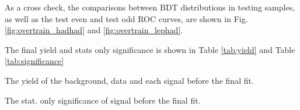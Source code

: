

As a cross check, the comparisons between BDT distributions in testing samples, as well as the test even and test odd ROC curves, are shown in Fig. \ref{fig:overtrain_hadhad} and \ref{fig:overtrain_lephad}.



The final yield and stats only significance is shown in Table \ref{tab:yield} and Table \ref{tab:significance}

\begin{table}
\caption{The yield of the background, data and each signal before the final fit.}
\label{tab:yield}
%

%
\end{table}

\begin{table}
\caption{The stat. only significance of signal before the final fit.}
\label{tab:significance}
%

%
\end{table}
